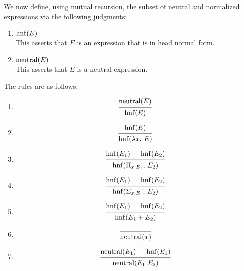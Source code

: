 \documentclass{article}
\begin{document}
\begin{definition} 
We now define, using mutual recursion, the subset of neutral and 
normalized expressions via the following judgments:
\begin{enumerate}
  \item $\operatorname{hnf}(E)$ \\
    This asserts that $E$ is an expression that is in head normal form.
  
  \item $\operatorname{neutral}(E)$ \\
    This asserts that $E$ is a neutral expression.
\end{enumerate}

The rules are as follows:
\begin{enumerate}
  \item \[
    \begin{prooftree}
      \hypo{\neutral(E)}
      \infer1{\hnf(E)}
    \end{prooftree}
  \]

  \item \[
    \begin{prooftree}
      \hypo{\hnf(E)}
      \infer1{\hnf(\lambda x, \, E)}
    \end{prooftree}
  \]

  \item \[
    \begin{prooftree}
      \hypo{\hnf(E_1)}
      \hypo{\hnf(E_2)}
      \infer2{\hnf(\Pi_{x : E_1}, \, E_2)}
    \end{prooftree}
  \]

 \item \[
    \begin{prooftree}
      \hypo{\hnf(E_1)}
      \hypo{\hnf(E_2)}
      \infer2{\hnf(\Sigma_{x : E_1}, \, E_2)}
    \end{prooftree}
  \]

 \item \[
    \begin{prooftree}
      \hypo{\hnf(E_1)}
      \hypo{\hnf(E_2)}
      \infer2{\hnf(E_1 + E_2)}
    \end{prooftree}
  \]

  \item \[
    \begin{prooftree}
      \infer0{\neutral(x)}
    \end{prooftree}
  \]

  \item \[
    \begin{prooftree}
      \hypo{\neutral(E_1)} 
      \hypo{\hnf(E_1)} 
      \infer2{\neutral(E_1 \,\, E_2)}
    \end{prooftree}
  \]


\end{enumerate}
\end{definition}
\end{document}
